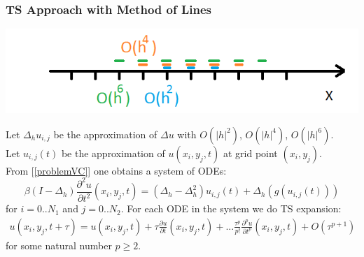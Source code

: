 \documentclass{beamer}
\newcommand{\be}{\begin{equation}}
\newcommand{\ee}{\end{equation}}
\begin{document}
\begin{frame}
\frametitle{TS Approach with Method of Lines}
\begin{center}\vspace{0.25cm}
	\begin{minipage}[b]{0.45\linewidth}
		 \includegraphics[width=\linewidth]{figures/FDS.png}
	\end{minipage}	
\end{center}
Let $\Delta_h u_{i,j}$ be the approximation of $\Delta u$ with $O(|h|^2)$, $O(|h|^4)$, $O(|h|^6)$.
\\
Let $u_{i,j}(t)$ be the approximation of $u(x_i, y_j, t)$ at grid point $(x_i, y_j)$.
\\
From [\ref{problemVC}] one obtains a system of ODEs:
\be \label{DiscreteEq}
\beta (I-\Delta_h) \frac{\partial^2 u}{\partial t^2}(x_i, y_j, t)=
 (\Delta_h - \Delta_h^2) u_{i, j}(t) + \Delta_h ( g( u_{i, j}(t) ) )
\ee
for $i = 0..N_1$ and $j=0..N_2$. For each ODE in the system we do TS expansion:
\begin{align} \label{TSe}
u(x_i, y_j, t+\tau) = u(x_i, y_j, t) + \tau \frac{ \partial u }{ \partial t }(x_i, y_j, t)  + ... 
\frac{ \tau^p }{ p! } \frac{ \partial^p u }{ \partial t^p }(x_i, y_j, t) + O(\tau^{p+1})
\end{align}
for some natural number $p \ge 2$.
\end{frame}

\end{document}
